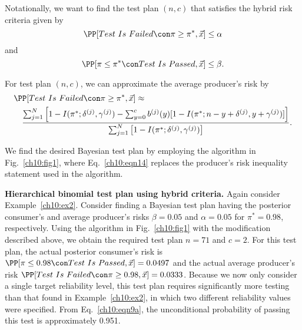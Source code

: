 \documentclass {book}
\begin{document}
Notationally, we want to find the test plan $(n,c)$ that satisfies
the hybrid risk criteria given by
\begin{equation}\label{ch10:eqn12}
\PP[Test\mbox{ }Is\mbox{ }Failed \con\pi\geq\pi^{*}, \vec{x}] \leq
\alpha
\end{equation}
and
\begin{equation}\label{ch10:eqn13}
\PP[\pi \leq \pi^{*} \con Test\mbox{ }Is\mbox{ }Passed,\vec{x}]
\leq \beta.
\end{equation}

For test plan $(n,c)$, we can approximate the average producer's
risk by
\begin{eqnarray}\label{ch10:eqn14}
\lefteqn{\PP[Test\mbox{ }Is\mbox{ }Failed \con \pi\geq\pi^{*},
\vec{x}] \approx} \\
& & \frac{\sum^{N}_{j=1} \left[
1-I(\pi^{*};\delta^{(j)},\gamma^{(j)})-\sum^{c}_{y=0} b^{(j)}(y)
[1-I(\pi^{*};n-y+\delta^{(j)}, y+\gamma^{(j)})] \right]}
{\sum^{N}_{j=1} \left[ 1-I(\pi^{*};\delta^{(j)},\gamma^{(j)})
\right] } .\nonumber
\end{eqnarray}

We find the desired Bayesian test plan by employing the algorithm
in Fig.~\ref{ch10:fig1}, where Eq.~\ref{ch10:eqn14} replaces the
producer's risk inequality statement used in the algorithm.

\begin{sidebar}\label{ch10:ex3} {\bf Hierarchical binomial test plan using hybrid
criteria.} Again consider Example~\ref{ch10:ex2}. Consider finding
a Bayesian test plan having the posterior consumer's and
average producer's risks $\beta = 0.05$ and $\alpha = 0.05$ for
$\pi^{*} = 0.98$, respectively. Using the algorithm in
Fig.~\ref{ch10:fig1} with the modification described above, we
obtain the required test plan $n = 71$ and $c = 2$. For this test
plan, the actual posterior consumer's risk is
$\PP[\pi\leq 0.98 \con Test\mbox{ }Is\mbox{ }Passed, \vec{x} ] =
0.0497$ and the actual average producer's risk $\PP[Test\mbox{
}Is\mbox{ }Failed \con \pi\geq 0.98, \vec{x}] = 0.0333$. Because we
now only consider a single target reliability level, this test
plan requires significantly more testing than that found in
Example~\ref{ch10:ex2}, in which two different reliability values
were specified. From Eq.~\ref{ch10:eqn9a}, the unconditional
probability of passing this test is approximately 0.951.
\end{sidebar}
\end{document}
